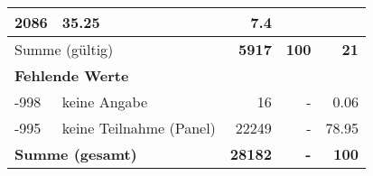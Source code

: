\begin{longtable}{lXrrr}
       \num{2086} &
       \num[round-mode=places,round-precision=2]{35.25} &
         \num[round-mode=places,round-precision=2]{7.4} \\
     \midrule
     \multicolumn{2}{l}{Summe (gültig)} &
       \textbf{\num{5917}} &
     \textbf{100} &
       \textbf{\num[round-mode=places,round-precision=2]{21}} \\
     \multicolumn{5}{l}{\textbf{Fehlende Werte}}\\
       -998 &
       keine Angabe &
         \num{16} &
        - &
         \num[round-mode=places,round-precision=2]{0.06} \\
       -995 &
       keine Teilnahme (Panel) &
         \num{22249} &
        - &
         \num[round-mode=places,round-precision=2]{78.95} \\
     \midrule
     \multicolumn{2}{l}{\textbf{Summe (gesamt)}} &
          \textbf{\num{28182}} &
        \textbf{-} &
        \textbf{100} \\
     \bottomrule
     \end{longtable}
     
